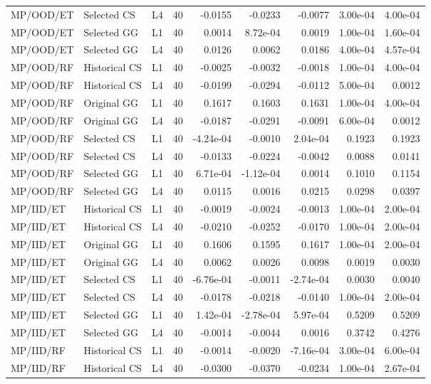 \documentclass[9pt]{article}
\begin{document}
\begin{longtable}{p{2.0cm}p{1.35cm}ccrrrrr}
MP/OOD/ET & Selected CS & L4 & 40 & -0.0155 & -0.0233 & -0.0077 & 3.00e-04 & 4.00e-04\\
MP/OOD/ET & Selected GG & L1 & 40 & 0.0014 & 8.72e-04 & 0.0019 & 1.00e-04 & 1.60e-04\\
MP/OOD/ET & Selected GG & L4 & 40 & 0.0126 & 0.0062 & 0.0186 & 4.00e-04 & 4.57e-04\\
MP/OOD/RF & Historical CS & L1 & 40 & -0.0025 & -0.0032 & -0.0018 & 1.00e-04 & 4.00e-04\\
MP/OOD/RF & Historical CS & L4 & 40 & -0.0199 & -0.0294 & -0.0112 & 5.00e-04 & 0.0012\\
MP/OOD/RF & Original GG & L1 & 40 & 0.1617 & 0.1603 & 0.1631 & 1.00e-04 & 4.00e-04\\
MP/OOD/RF & Original GG & L4 & 40 & -0.0187 & -0.0291 & -0.0091 & 6.00e-04 & 0.0012\\
MP/OOD/RF & Selected CS & L1 & 40 & -4.24e-04 & -0.0010 & 2.04e-04 & 0.1923 & 0.1923\\
MP/OOD/RF & Selected CS & L4 & 40 & -0.0133 & -0.0224 & -0.0042 & 0.0088 & 0.0141\\
MP/OOD/RF & Selected GG & L1 & 40 & 6.71e-04 & -1.12e-04 & 0.0014 & 0.1010 & 0.1154\\
MP/OOD/RF & Selected GG & L4 & 40 & 0.0115 & 0.0016 & 0.0215 & 0.0298 & 0.0397\\
MP/IID/ET & Historical CS & L1 & 40 & -0.0019 & -0.0024 & -0.0013 & 1.00e-04 & 2.00e-04\\
MP/IID/ET & Historical CS & L4 & 40 & -0.0210 & -0.0252 & -0.0170 & 1.00e-04 & 2.00e-04\\
MP/IID/ET & Original GG & L1 & 40 & 0.1606 & 0.1595 & 0.1617 & 1.00e-04 & 2.00e-04\\
MP/IID/ET & Original GG & L4 & 40 & 0.0062 & 0.0026 & 0.0098 & 0.0019 & 0.0030\\
MP/IID/ET & Selected CS & L1 & 40 & -6.76e-04 & -0.0011 & -2.74e-04 & 0.0030 & 0.0040\\
MP/IID/ET & Selected CS & L4 & 40 & -0.0178 & -0.0218 & -0.0140 & 1.00e-04 & 2.00e-04\\
MP/IID/ET & Selected GG & L1 & 40 & 1.42e-04 & -2.78e-04 & 5.97e-04 & 0.5209 & 0.5209\\
MP/IID/ET & Selected GG & L4 & 40 & -0.0014 & -0.0044 & 0.0016 & 0.3742 & 0.4276\\
MP/IID/RF & Historical CS & L1 & 40 & -0.0014 & -0.0020 & -7.16e-04 & 3.00e-04 & 6.00e-04\\
MP/IID/RF & Historical CS & L4 & 40 & -0.0300 & -0.0370 & -0.0234 & 1.00e-04 & 2.67e-04\\

\end{longtable}
\end{document}
